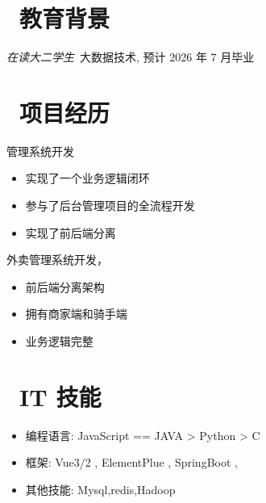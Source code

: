 \documentclass{resume}
\begin{document}


 
\section{\faGraduationCap\  教育背景}
\textit{在读大二学生}\ 大数据技术, 预计 2026 年 7 月毕业

\section{\faUsers\ 项目经历}
管理系统开发
\begin{itemize}
  \item 实现了一个业务逻辑闭环
  \item 参与了后台管理项目的全流程开发
  \item 实现了前后端分离
\end{itemize}


\begin{onehalfspacing}
外卖管理系统开发，
\begin{itemize}
  \item 前后端分离架构
  \item 拥有商家端和骑手端
  \item 业务逻辑完整
\end{itemize}
\end{onehalfspacing}


\section{\faCogs\ IT 技能}
\begin{itemize}[parsep=0.5ex]
  \item 编程语言:  JavaScript == JAVA > Python > C
  \item 框架: Vue3/2 , ElementPlue , SpringBoot ,   
  \item 其他技能: Mysql,redis,Hadoop
\end{itemize}
\end{document}
